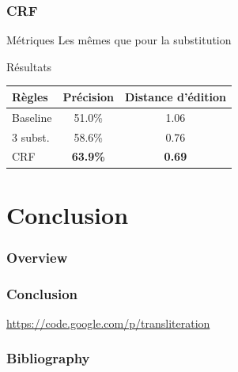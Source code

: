 \documentclass{beamer}
\begin{document}
\begin{frame}
\frametitle{CRF}

\begin{block}{Métriques}
Les m\^emes que pour la substitution
\end{block}

\begin{block}{Résultats}
\begin{center}
\begin{tabular}{|l|c|c|}
\hline
Règles&Précision&Distance d'édition\\
\hline
Baseline&51.0\%&1.06\\
\hline
3 subst.&58.6\%&0.76\\
\hline
CRF&\textbf{63.9\%}&\textbf{0.69}\\
\hline
\end{tabular}
\end{center}
\end{block}

\end{frame}


\section{Conclusion}


\begin{frame}
    \frametitle{Overview}
\end{frame}

\begin{frame}
    \frametitle{Conclusion}
    \url{https://code.google.com/p/transliteration}
\end{frame}


\begin{frame}
    \frametitle{Bibliography}
    {\fontsize{0.8em}{1em}
    \nocite{*}
    
    }
\end{frame}
\end{document}
